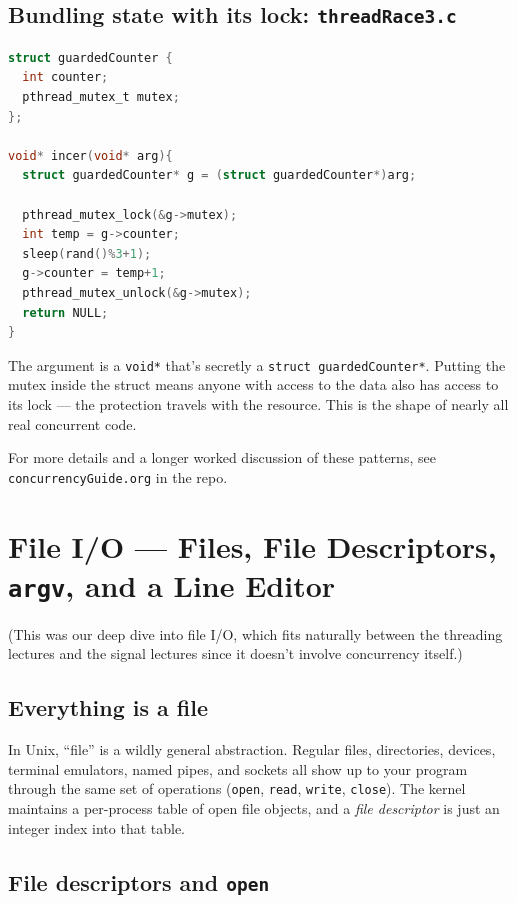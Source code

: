 \documentclass[11pt]{article}
\begin{document}
\subsection*{Bundling state with its lock: \texttt{threadRace3.c}}

\begin{lstlisting}[language=C]
struct guardedCounter {
  int counter;
  pthread_mutex_t mutex;
};

void* incer(void* arg){
  struct guardedCounter* g = (struct guardedCounter*)arg;

  pthread_mutex_lock(&g->mutex);
  int temp = g->counter;
  sleep(rand()%3+1);
  g->counter = temp+1;
  pthread_mutex_unlock(&g->mutex);
  return NULL;
}
\end{lstlisting}

The argument is a \texttt{void*} that's secretly a
\texttt{struct guardedCounter*}. Putting the mutex inside the
struct means anyone with access to the data also has access to its
lock --- the protection travels with the resource. This is the
shape of nearly all real concurrent code.

For more details and a longer worked discussion of these patterns,
see \texttt{concurrencyGuide.org} in the repo.

\section{File I/O --- Files, File Descriptors, \texttt{argv}, and a Line Editor}

(This was our deep dive into file I/O, which fits naturally between
the threading lectures and the signal lectures since it doesn't
involve concurrency itself.)

\subsection*{Everything is a file}

In Unix, ``file'' is a wildly general abstraction. Regular files,
directories, devices, terminal emulators, named pipes, and sockets
all show up to your program through the same set of operations
(\texttt{open}, \texttt{read}, \texttt{write}, \texttt{close}). The
kernel maintains a per-process table of open file objects, and a
\emph{file descriptor} is just an integer index into that table.

\subsection*{File descriptors and \texttt{open}}
\end{document}

